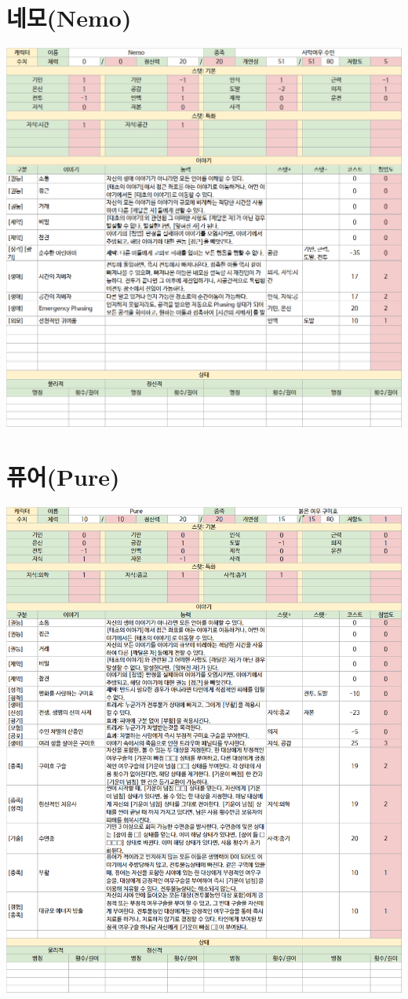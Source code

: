 \documentclass{report}
\begin{document}
	\section*{네모(Nemo)}
		\includegraphics[width=\textwidth]{./Chapters/WoS/sheets/nemo.png}
	
	\section*{퓨어(Pure)}
		\includegraphics[width=\textwidth]{./Chapters/WoS/sheets/pure.png}
	
\end{document}

